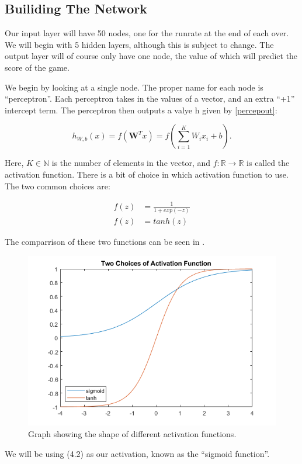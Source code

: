 \subsection{Builiding The Network}
Our input layer will have 50 nodes, one for the runrate at the end of each over. We will begin with 5 hidden layers, although this is subject to change. The output layer
will of course only have one node, the value of which will predict the score of the game. 

We begin by looking at a single node. The proper name for each node is ``perceptron''. Each perceptron takes in the values of a vector, and an extra ``+1'' intercept term. The perceptron then outputs a valye h given by \ref{percepout}:

\begin{equation}
    \label{percepout}
    h_{W,b}(x) = f(\textbf{W}^Tx) = f(\sum_{i=1}^KW_ix_i+b).
\end{equation}

Here, $K \in \mathbb{N}$ is the number of elements in the vector, and $f:\mathbb{R} \rightarrow \mathbb{R}$ is called the activation function. There is a bit of choice in which activation function to use.
The two common choices are:

\begin{align}
    f(z) &= \frac{1}{1+exp(-z)} \\
    f(z) &= tanh(z)
\end{align}

The comparrison of these two functions can be seen in .

\begin{figure}[h]
    \centering
    \label{actfig}
    \includegraphics[scale=0.5]{figures/actfuncs.png}
    \caption{Graph showing the shape of different activation functions.}
\end{figure}

We will be using (4.2) as our activation, known as the ``sigmoid function''. 